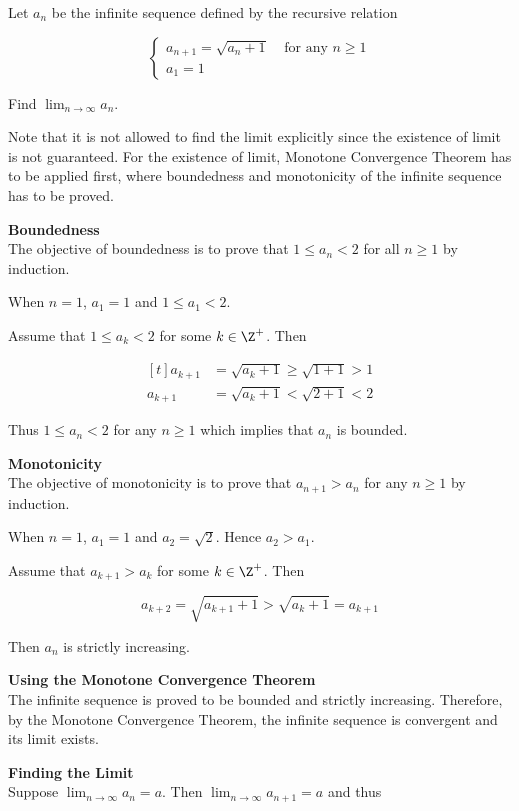 \begin{exm}
  Let $a_{n}$ be the infinite sequence defined by the recursive relation

  $$\left\{\begin{matrix}
    a_{n+1}=\sqrt{a_{n}+1}\;\;\;\;\text{for any }n\geq 1 \\
    a_{1}=1
  \end{matrix}\right.$$\s

  Find $\lim_{n\to \infty}a_{n}$.\n

  \ans Note that it is not allowed to find the limit explicitly since the existence of limit is not guaranteed. For the existence of limit, Monotone Convergence Theorem has to be applied first, where boundedness and monotonicity of the infinite sequence has to be proved.\n

  \begin{alist}
   \item \textbf{Boundedness}\\
   The objective of boundedness is to prove that $1\leq a_{n}<2$ for all $n\geq 1$ by induction.\n
   \begin{rlist}
     \item When $n=1$, $a_{1}=1$ and $1\leq a_{1}<2$.
     \item Assume that $1\leq a_{k}<2$ for some $k\in \Z^{+}$. Then

     $$\begin{aligned}[t]
       a_{k+1}&=\sqrt{a_{k}+1}\geq \sqrt{1+1}>1\\
       a_{k+1}&=\sqrt{a_{k}+1}<\sqrt{2+1}<2
     \end{aligned}$$
   \end{rlist}
   Thus $1\leq a_{n}<2$ for any $n\geq 1$ which implies that $a_{n}$ is bounded.
   \item \textbf{Monotonicity}\\
   The objective of monotonicity is to prove that $a_{n+1}>a_{n}$ for any $n\geq 1$ by induction.\n
   \begin{rlist}
     \item When $n=1$, $a_{1}=1$ and $a_{2}=\sqrt{2}$. Hence $a_{2}>a_{1}$.
     \item Assume that $a_{k+1}>a_{k}$ for some $k\in \Z^{+}$. Then

     $$a_{k+2}=\sqrt{a_{k+1}+1}>\sqrt{a_{k}+1}=a_{k+1}$$
   \end{rlist}
   Then $a_{n}$ is strictly increasing.
   \item \textbf{Using the Monotone Convergence Theorem}\\
   The infinite sequence is proved to be bounded and strictly increasing. Therefore, by the Monotone Convergence Theorem, the infinite sequence is convergent and its limit exists.
   \item \textbf{Finding the Limit}\\
   Suppose $\lim_{n\to \infty}a_{n}=a$. Then $\lim_{n\to \infty}a_{n+1}=a$ and thus


\end{alist}
\end{exm}
